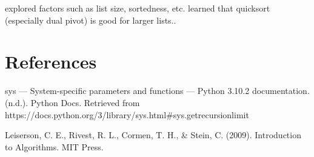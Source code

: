 \documentclass[12pt]{article}
\begin{document}
explored factors such as list size, sortedness, etc.
learned that quicksort (especially dual pivot) is good for larger lists..

\newpage\section*{References}
\begin{enumerate}[label={[\arabic*]}]
\item	sys — System-specific parameters and functions — Python 3.10.2 documentation. (n.d.). Python Docs. Retrieved from https://docs.python.org/3/library/sys.html\#sys.getrecursionlimit
\item	Leiserson, C. E., Rivest, R. L., Cormen, T. H., \& Stein, C. (2009). Introduction to Algorithms. MIT Press.

\end{enumerate}
\end{document}
